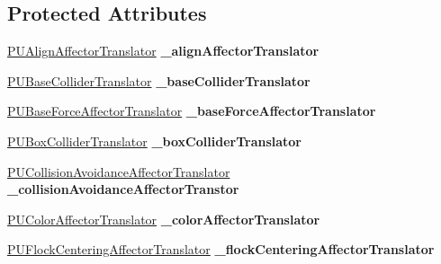 \subsection*{Protected Attributes}
\begin{DoxyCompactItemize}
\item 
\mbox{\label{classPUAffectorManager_ad4114af8654c0babc733c63d939bbef5}} 
\hyperlink{classPUAlignAffectorTranslator}{P\+U\+Align\+Affector\+Translator} {\bfseries \+\_\+align\+Affector\+Translator}
\item 
\mbox{\label{classPUAffectorManager_a7de20ffa6c5653d332ef85b5fe3182d9}} 
\hyperlink{classPUBaseColliderTranslator}{P\+U\+Base\+Collider\+Translator} {\bfseries \+\_\+base\+Collider\+Translator}
\item 
\mbox{\label{classPUAffectorManager_a04d6337763fa6daf41b5d15452cf7c31}} 
\hyperlink{classPUBaseForceAffectorTranslator}{P\+U\+Base\+Force\+Affector\+Translator} {\bfseries \+\_\+base\+Force\+Affector\+Translator}
\item 
\mbox{\label{classPUAffectorManager_a884897052a7244729a8c6e442bd4a1d9}} 
\hyperlink{classPUBoxColliderTranslator}{P\+U\+Box\+Collider\+Translator} {\bfseries \+\_\+box\+Collider\+Translator}
\item 
\mbox{\label{classPUAffectorManager_a77b5c6cc8c806d894de7cf239ca491ef}} 
\hyperlink{classPUCollisionAvoidanceAffectorTranslator}{P\+U\+Collision\+Avoidance\+Affector\+Translator} {\bfseries \+\_\+collision\+Avoidance\+Affector\+Transtor}
\item 
\mbox{\label{classPUAffectorManager_a00449915aa6e4aea22bf571b32253d19}} 
\hyperlink{classPUColorAffectorTranslator}{P\+U\+Color\+Affector\+Translator} {\bfseries \+\_\+color\+Affector\+Translator}
\item 
\mbox{\label{classPUAffectorManager_acf6d72441f5b168a21c2dac973c0b316}} 
\hyperlink{classPUFlockCenteringAffectorTranslator}{P\+U\+Flock\+Centering\+Affector\+Translator} {\bfseries \+\_\+flock\+Centering\+Affector\+Translator}
\item 
\mbox{\label{classPUAffectorManager_aa03f2abe7dd4c37d0d49c683b4e55c9c}} 

\end{DoxyCompactItemize}
